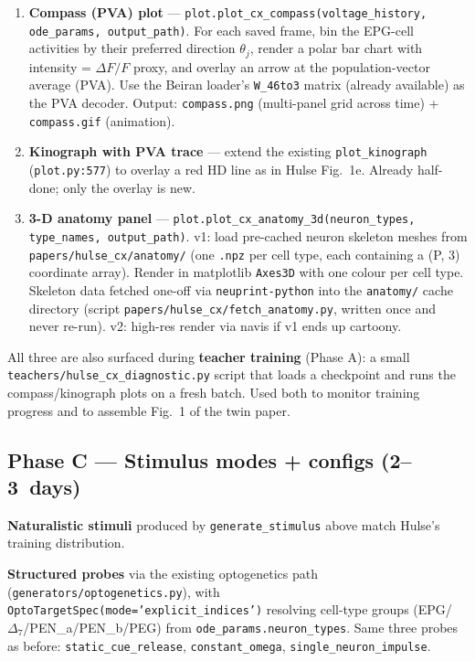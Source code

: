 \documentclass[11pt]{article}
\begin{document}
\begin{enumerate}[leftmargin=*]
\item \textbf{Compass (PVA) plot} ---
   \texttt{plot.plot\_cx\_compass(voltage\_history, ode\_params, output\_path)}.
   For each saved frame, bin the EPG-cell activities by their preferred
   direction $\theta_j$, render a polar bar chart with intensity =
   $\Delta F/F$ proxy, and overlay an arrow at the population-vector
   average (PVA). Use the Beiran loader's
   \texttt{W\_46to3} matrix (already available) as the PVA decoder.
   Output: \texttt{compass.png} (multi-panel grid across time) +
   \texttt{compass.gif} (animation).
\item \textbf{Kinograph with PVA trace} --- extend the existing
   \texttt{plot\_kinograph} (\texttt{plot.py:577}) to overlay a red HD
   line as in Hulse Fig.~1e. Already half-done; only the overlay is new.
\item \textbf{3-D anatomy panel} ---
   \texttt{plot.plot\_cx\_anatomy\_3d(neuron\_types, type\_names, output\_path)}.
   v1: load pre-cached neuron skeleton meshes from
   \texttt{papers/hulse\_cx/anatomy/} (one \texttt{.npz} per cell type,
   each containing a (P, 3) coordinate array). Render in matplotlib
   \texttt{Axes3D} with one colour per cell type. Skeleton data fetched
   one-off via \texttt{neuprint-python} into the
   \texttt{anatomy/} cache directory (script
   \texttt{papers/hulse\_cx/fetch\_anatomy.py}, written once and never
   re-run). v2: high-res render via navis if v1 ends up cartoony.
\end{enumerate}

All three are also surfaced during \textbf{teacher training}
(Phase A): a small \texttt{teachers/hulse\_cx\_diagnostic.py} script
that loads a checkpoint and runs the compass/kinograph plots on a fresh
batch. Used both to monitor training progress and to assemble Fig.~1 of
the twin paper.

\subsection*{Phase C --- Stimulus modes + configs (2--3~days)}

\textbf{Naturalistic stimuli} produced by \texttt{generate\_stimulus} above
match Hulse's training distribution.

\textbf{Structured probes} via the existing optogenetics path
(\texttt{generators/optogenetics.py}), with
\texttt{OptoTargetSpec(mode='explicit\_indices')} resolving cell-type
groups (EPG/$\Delta_7$/PEN\_a/PEN\_b/PEG) from
\texttt{ode\_params.neuron\_types}. Same three probes as before:
\texttt{static\_cue\_release}, \texttt{constant\_omega},
\texttt{single\_neuron\_impulse}.
\end{document}
